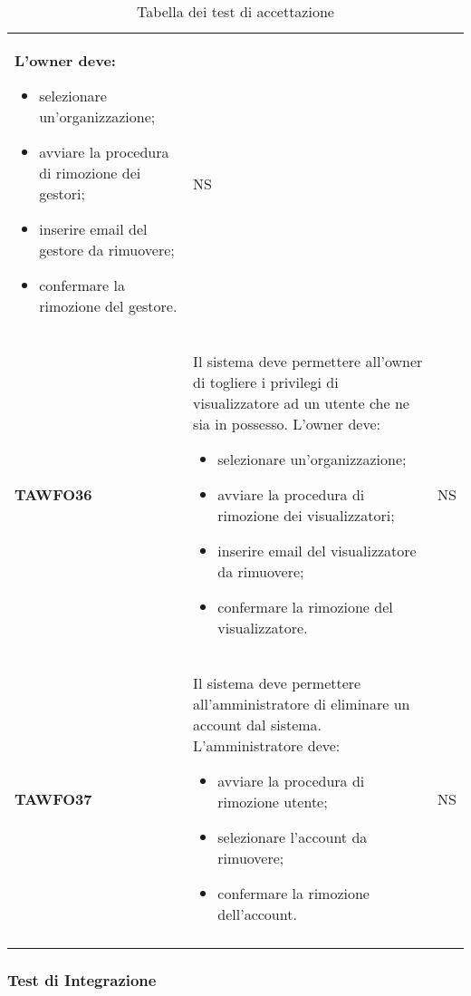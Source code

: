 \documentclass[../piano-di-qualifica.tex]{subfiles}
\begin{document}
\begin{centering}
\begin{longtable}[H]{>{\centering\bfseries}m{3cm} >{}p{10cm} >{\centering\arraybackslash}m{3cm}}
                L'owner deve:
                \begin{itemize}
                \item selezionare un'organizzazione;
                \item avviare la procedura di rimozione dei gestori;
                \item inserire email del gestore da rimuovere;
                \item confermare la rimozione del gestore.
                \end{itemize}
                & NS \\
        TAWFO36      & Il sistema deve permettere all'owner di togliere i privilegi di visualizzatore ad un utente che ne sia in possesso. \newline
                L'owner deve:
                \begin{itemize}
                \item selezionare un'organizzazione;
                \item avviare la procedura di rimozione dei visualizzatori;
                \item inserire email del visualizzatore da rimuovere;
                \item confermare la rimozione del visualizzatore.
                \end{itemize}
                & NS \\
        TAWFO37      & Il sistema deve permettere all'amministratore di eliminare un account dal sistema. \newline
                L'amministratore deve:
                \begin{itemize}
                \item avviare la procedura di rimozione utente;
                \item selezionare l'account da rimuovere;
                \item confermare la rimozione dell'account.
                \end{itemize}
                & NS \\
        \caption{Tabella dei test di accettazione}%
        \label{tab:test_accettazione}
      \end{longtable}
    \end{centering}

\subsubsection{Test di Integrazione}%
\label{subs:test_di_integrazione}
\end{document}
